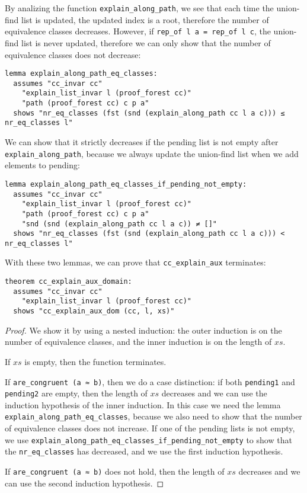 By analizing the function \lstinline{explain_along_path}, we see that each time the union-find list is updated, the updated index is a root, therefore the number of equivalence classes decreases.
However, if \lstinline{rep_of l a = rep_of l c}, the union-find list is never updated, therefore we can only show that the number of equivalence classes does not decrease:

\begin{lstlisting}
lemma explain_along_path_eq_classes:
  assumes "cc_invar cc"
    "explain_list_invar l (proof_forest cc)"
    "path (proof_forest cc) c p a"
  shows "nr_eq_classes (fst (snd (explain_along_path cc l a c))) ≤ nr_eq_classes l"
\end{lstlisting}

We can show that it strictly decreases if the pending list is not empty after \lstinline{explain_along_path}, because we always update the union-find list when we add elements to pending:

\begin{lstlisting}
lemma explain_along_path_eq_classes_if_pending_not_empty:
  assumes "cc_invar cc"
    "explain_list_invar l (proof_forest cc)"
    "path (proof_forest cc) c p a"
    "snd (snd (explain_along_path cc l a c)) ≠ []"
  shows "nr_eq_classes (fst (snd (explain_along_path cc l a c))) < nr_eq_classes l"
\end{lstlisting}

With these two lemmas, we can prove that \lstinline{cc_explain_aux} terminates:

\begin{lstlisting}
theorem cc_explain_aux_domain:
  assumes "cc_invar cc"
    "explain_list_invar l (proof_forest cc)"
  shows "cc_explain_aux_dom (cc, l, xs)"
\end{lstlisting}


\begin{proof}
We show it by using a nested induction: the outer induction is on the number of equivalence classes, and the inner induction is on the length of $xs$.

If $xs$ is empty, then the function terminates.

If \lstinline{are_congruent (a ≈ b)}, then we do a case distinction: if both \lstinline{pending1} and \lstinline{pending2} are empty, then the length of $xs$ decreases and we can use the induction hypothesis of the inner induction. In this case we need the lemma \lstinline{explain_along_path_eq_classes}, because we also need to show that the number of equivalence classes does not increase. If one of the pending lists is not empty, we use \lstinline{explain_along_path_eq_classes_if_pending_not_empty} to show that the \lstinline{nr_eq_classes} has decreased, and we use the first induction hypothesis.

If \lstinline{are_congruent (a ≈ b)} does not hold, then the length of $xs$ decreases and we can use the second induction hypothesis.
\end{proof}


